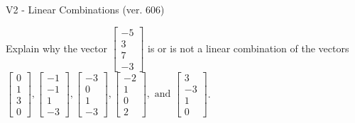 \begin{exercise}
  \begin{exerciseTitle}V2 - Linear Combinations (ver. 606)\end{exerciseTitle}
  \begin{exerciseStatement}
    Explain why the vector \(\left[\begin{array}{c}
-5 \\
3 \\
7 \\
-3
\end{array}\right]\)  is or is not a linear 
	combination of the vectors \(\left[\begin{array}{c}
0 \\
1 \\
3 \\
0
\end{array}\right] , \left[\begin{array}{c}
-1 \\
-1 \\
1 \\
-3
\end{array}\right] , \left[\begin{array}{c}
-3 \\
0 \\
1 \\
-3
\end{array}\right] , \left[\begin{array}{c}
-2 \\
1 \\
0 \\
2
\end{array}\right] , \text{ and } \left[\begin{array}{c}
3 \\
-3 \\
1 \\
0
\end{array}\right]\).
	



\end{exerciseStatement}
\end{exercise}
